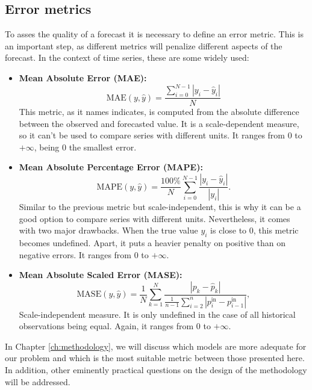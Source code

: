 \subsection{Error metrics}
To asses the quality of a forecast it is necessary to define an error metric. This is an important step, as different metrics will penalize different aspects of the forecast. In the context of time series, these are some widely used: \cite{hyndman2006another,ts-metrics-formulas}
\begin{itemize}
    \item \textbf{Mean Absolute Error (MAE):}
    \begin{equation}
        \label{eq:mae}
        \text{MAE}(y, \hat{y}) = \frac{ \sum_{i=0}^{N - 1} |y_i - \hat{y}_i| }{N}
    \end{equation}
    This metric, as it names indicates, is computed from the absolute difference between the observed and forecasted value. It is a scale-dependent measure, so it can't be used to compare series with different units. It ranges from 0 to $+\infty$, being 0 the smallest error.
    \item \textbf{Mean Absolute Percentage Error (MAPE):}
    \begin{equation}
        \label{eq:mape}
        \text{MAPE}(y, \hat{y}) = \frac{100\%}{N} \sum_{i=0}^{N - 1} \frac{|y_i - \hat{y}_i|}{|y_i|}.
    \end{equation}
    Similar to the previous metric but scale-independent, this is why it can be a good option to compare series with different units. Nevertheless, it comes with two major drawbacks. When the true value $y_i$ is close to 0, this metric becomes undefined. Apart, it puts a heavier penalty on positive than on negative errors. It ranges from 0 to $+\infty$.
    \item \textbf{Mean Absolute Scaled Error (MASE):}
    \begin{equation}
        \label{eq:mase}
        \text{MASE}(y, \hat{y}) = \frac{1}{N}\sum_{k=1}^{N}\frac{|p_k-\hat{p}_k|}{\frac{1}{n-1}\sum_{i=2}^{n} |p^\mathrm{in}_i - p^\mathrm{in}_{i-1} |},
    \end{equation}
    Scale-independent measure. It is only undefined in the case of all historical observations being equal. Again, it ranges from 0 to $+\infty$.

\end{itemize}

\noindent In Chapter \ref{ch:methodology}, we will discuss which models are more adequate for our problem and which is the most suitable metric between those presented here. In addition, other eminently practical questions on the design of the methodology will be addressed.

